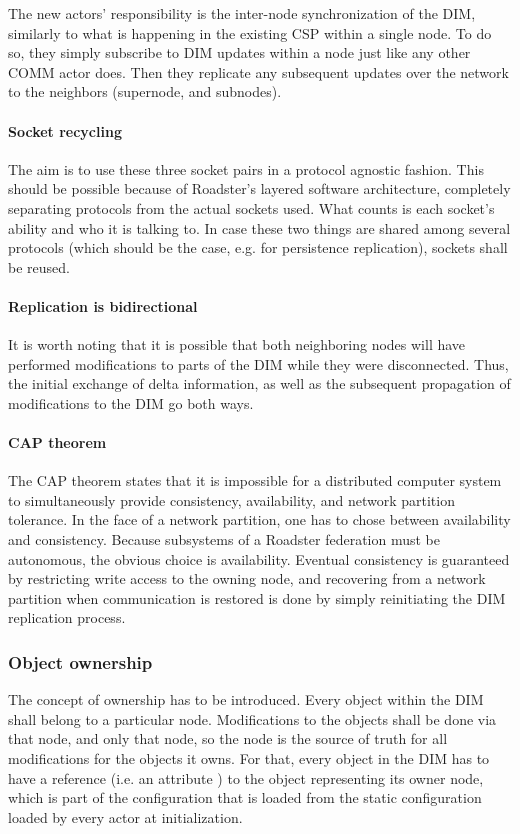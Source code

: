 The new actors' responsibility is the inter-node synchronization of the DIM,
similarly to what is happening in the existing \gls{CSP} within a single node.
To do so, they simply subscribe to DIM updates within a node just like any
other COMM actor does.  Then they replicate any subsequent updates over the network
to the neighbors (supernode, and subnodes).

\paragraph{Socket recycling}
The aim is to use these three socket pairs in a protocol agnostic fashion. This
should be possible because of Roadster's layered software architecture,
completely separating protocols from the actual sockets used. What counts is
each socket's ability and who it is talking to. In case these two things are shared
among several protocols (which should be the case, e.g. for persistence
replication), sockets shall be reused.

\paragraph{Replication is bidirectional}
It is worth noting that it is possible that both neighboring nodes will have performed
modifications to parts of the DIM while they were
disconnected. Thus, the initial exchange of delta information, as well as the
subsequent propagation of modifications to the DIM go both ways.

\paragraph{CAP theorem}
The CAP theorem \cite{wp:cap} states that it is impossible for a distributed
computer system to simultaneously provide consistency, availability, and
network partition tolerance. In the face of a network partition, one has to
chose between availability and consistency. Because subsystems of a Roadster
federation must be autonomous, the obvious choice is availability. Eventual
consistency is guaranteed by restricting write access to the owning node, and
recovering from a network partition when communication is restored is done by
simply reinitiating the DIM replication process.

\subsubsection{Object ownership}
The concept of ownership has to be introduced. Every object within the DIM
shall belong to a particular node. Modifications to the objects shall be done via
that node, and only that node, so the node is the source of truth for all modifications for the
objects it owns. For that, every object in the DIM has to have a reference
(i.e. an attribute ) to the object representing its owner node, which is part of
the configuration that is loaded from the static configuration loaded by every
actor at initialization.

